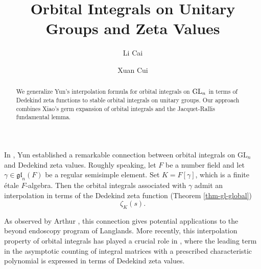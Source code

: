 \documentclass[a4paper]{amsart}
\theoremstyle{plain}
\theoremstyle{remark} \newtheorem{remark}[thm]{Remark}
\theoremstyle{exercise} \newtheorem{exercise}[thm]{Exercise}
\theoremstyle{example} \newtheorem{example}[thm]{Example}
\theoremstyle{question} \newtheorem{question}[thm]{Question}
\theoremstyle{assumption} \newtheorem{assumption}[thm]{Assumption}
\numberwithin{equation}{section}
\begin{document}
\title{Orbital Integrals on Unitary Groups and Zeta Values}







\author{Li Cai} 
\address[L.C.]{Academy for Multidisciplinary Studies, Beijing National Center for Applied Mathematics, Capital Normal University, Beijing, 100048, People's Republic of China
} 

\author{Xuan Cui} 
\address[X.C.]{Academy for Multidisciplinary Studies, Beijing National Center for Applied Mathematics, Capital Normal University, Beijing, 100048, People's Republic of China
} 



\begin{abstract}
We generalize Yun's interpolation formula for orbital integrals on 
${\mathrm{GL}}_n$ in terms of Dedekind zeta functions to stable orbital integrals on unitary groups. Our approach combines Xiao's germ expansion of orbital integrals and the Jacquet-Rallis fundamental lemma. 
\end{abstract}










\maketitle

\tableofcontents

In \cite{Yun13}, Yun established a remarkable connection between orbital integrals on $\mathrm{GL}_n$ and  Dedekind zeta values. Roughly speaking, let $F$ be a number field and let $\gamma\in\mathfrak{gl}_n(F)$ be a regular semisimple element. Set $K=F[\gamma]$, which is a finite étale $F$-algebra. Then the orbital integrals associated with $\gamma$ admit an interpolation in terms of the Dedekind zeta function (Theorem \ref{thm-gl-global})
\[\zeta_K(s).\]

As observed by Arthur \cite{Art18}, this connection 
gives potential applications to the beyond endoscopy program of Langlands. More recently, this interpolation property of orbital integrals has played a crucial role in \cite{CD25}, where the leading term in the asymptotic counting of integral matrices with a prescribed characteristic polynomial is expressed in terms of  Dedekind zeta values.
\end{document}

